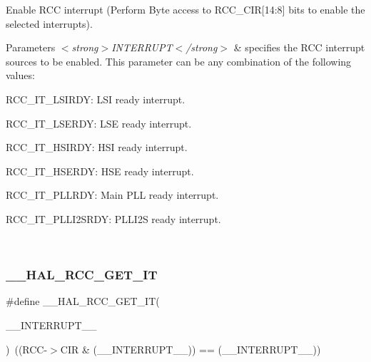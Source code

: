 Enable R\+CC interrupt (Perform Byte access to R\+C\+C\+\_\+\+C\+IR\mbox{[}14\+:8\mbox{]} bits to enable the selected interrupts). 


\begin{DoxyParams}{Parameters}
{\em $<$strong$>$\+I\+N\+T\+E\+R\+R\+U\+P\+T$<$/strong$>$} & specifies the R\+CC interrupt sources to be enabled. This parameter can be any combination of the following values\+: \begin{DoxyItemize}
\item R\+C\+C\+\_\+\+I\+T\+\_\+\+L\+S\+I\+R\+DY\+: L\+SI ready interrupt. \item R\+C\+C\+\_\+\+I\+T\+\_\+\+L\+S\+E\+R\+DY\+: L\+SE ready interrupt. \item R\+C\+C\+\_\+\+I\+T\+\_\+\+H\+S\+I\+R\+DY\+: H\+SI ready interrupt. \item R\+C\+C\+\_\+\+I\+T\+\_\+\+H\+S\+E\+R\+DY\+: H\+SE ready interrupt. \item R\+C\+C\+\_\+\+I\+T\+\_\+\+P\+L\+L\+R\+DY\+: Main P\+LL ready interrupt. \item R\+C\+C\+\_\+\+I\+T\+\_\+\+P\+L\+L\+I2\+S\+R\+DY\+: P\+L\+L\+I2S ready interrupt. \end{DoxyItemize}
\\
\hline
\end{DoxyParams}
\mbox{\label{group___r_c_c___flags___interrupts___management_ga134af980b892f362c05ae21922cd828d}} 
\subsubsection{\texorpdfstring{\+\_\+\+\_\+\+H\+A\+L\+\_\+\+R\+C\+C\+\_\+\+G\+E\+T\+\_\+\+IT}{\_\_HAL\_RCC\_GET\_IT}}
{\footnotesize\ttfamily \#define \+\_\+\+\_\+\+H\+A\+L\+\_\+\+R\+C\+C\+\_\+\+G\+E\+T\+\_\+\+IT(\begin{DoxyParamCaption}\item[{}]{\+\_\+\+\_\+\+I\+N\+T\+E\+R\+R\+U\+P\+T\+\_\+\+\_\+ }\end{DoxyParamCaption})~((R\+CC-\/$>$C\+IR \& (\+\_\+\+\_\+\+I\+N\+T\+E\+R\+R\+U\+P\+T\+\_\+\+\_\+)) == (\+\_\+\+\_\+\+I\+N\+T\+E\+R\+R\+U\+P\+T\+\_\+\+\_\+))}



